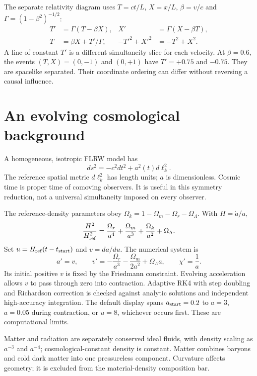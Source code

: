 \documentclass[11pt,a4paper]{article}
\begin{document}
The separate relativity diagram uses $T=ct/L$, $X=x/L$, $\beta=v/c$ and $\Gamma=(1-\beta^2)^{-1/2}$:
\begin{align}
T'&=\Gamma(T-\beta X),&X'&=\Gamma(X-\beta T),\\
T&=\beta X+T'/\Gamma,&-T'^2+X'^2&=-T^2+X^2.
\end{align}
A line of constant $T'$ is a different simultaneity slice for each velocity. At $\beta=0.6$, the events $(T,X)=(0,-1)$ and $(0,+1)$ have $T'=+0.75$ and $-0.75$. They are spacelike separated. Their coordinate ordering can differ without reversing a causal influence.
\section{An evolving cosmological background}
A homogeneous, isotropic FLRW model has
\begin{equation}
ds^2=-c^2dt^2+a^2(t)d\ell_k^2.
\end{equation}
The reference spatial metric $d\ell_k^2$ has length units; $a$ is dimensionless. Cosmic time is proper time of comoving observers. It is useful in this symmetry reduction, not a universal simultaneity imposed on every observer.

The reference-density parameters obey $\Omega_k=1-\Omega_m-\Omega_r-\Omega_\Lambda$. With $H=\dot a/a$,
\begin{equation}
\frac{H^2}{H_{\rm ref}^2}=\frac{\Omega_r}{a^4}+\frac{\Omega_m}{a^3}+\frac{\Omega_k}{a^2}+\Omega_\Lambda.
\end{equation}
Set $u=H_{\rm ref}(t-t_{\rm start})$ and $v=da/du$. The numerical system is
\begin{equation}
a'=v,\qquad v'=-\frac{\Omega_r}{a^3}-\frac{\Omega_m}{2a^2}+\Omega_\Lambda a,
\qquad\chi'=\frac1a.
\end{equation}
Its initial positive $v$ is fixed by the Friedmann constraint. Evolving acceleration allows $v$ to pass through zero into contraction. Adaptive RK4 with step doubling and Richardson correction is checked against analytic solutions and independent high-accuracy integration. The default display spans $a_{\rm start}=0.2$ to $a=3$, $a=0.05$ during contraction, or $u=8$, whichever occurs first. These are computational limits.

Matter and radiation are separately conserved ideal fluids, with density scaling as $a^{-3}$ and $a^{-4}$; cosmological-constant density is constant. Matter combines baryons and cold dark matter into one pressureless component. Curvature affects geometry; it is excluded from the material-density composition bar.
\end{document}
